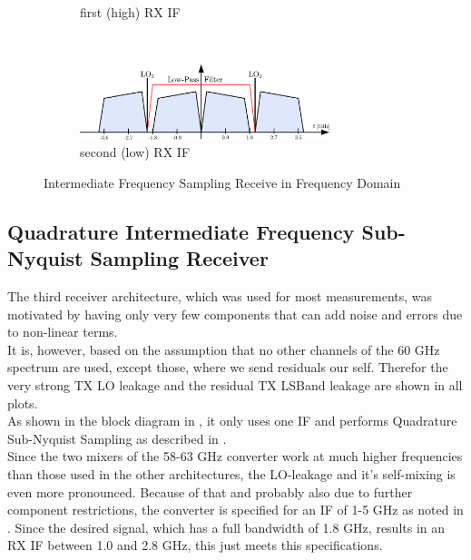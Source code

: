 \begin{figure}[p]
\begin{subfigure}{\textwidth}
    \caption{first (high) \gls{RX} \gls{IF}}
    \label{fig:rx_1_freq_rx_if1}
  \end{subfigure}
  \vspace{4ex} \\
  \begin{subfigure}{\textwidth}
    \centering
    \includegraphics[width=0.8\textwidth]{figures/rx_1_freq_rx_if2}
    \caption{second (low) \gls{RX} \gls{IF}}
    \label{fig:rx_1_freq_rx_if2}
  \end{subfigure}
  \caption{Intermediate Frequency Sampling Receive in Frequency Domain}
  \label{fig:rx_1_freq}
\end{figure}

\subsection{Quadrature Intermediate Frequency Sub-Nyquist Sampling Receiver}
\label{sec:rx_2}
The third receiver architecture, which was used for most measurements,
was motivated by having only very few components that can add noise
and errors due to non-linear terms. \\

It is, however, based on the assumption that no other channels of the
60 GHz spectrum are used, except those, where we send residuals our self.
Therefor the very strong \gls{TX} \gls{LO} leakage and
the residual \gls{TX} \gls{LSBand} leakage are shown in all plots. \\

As shown in the block diagram in , it only uses one
\gls{IF} and performs Quadrature Sub-Nyquist Sampling as described
in . \\

Since the two mixers of the 58-63 GHz converter work at much
higher frequencies than those used in the other architectures, the
\gls{LO}-leakage and it's self-mixing is even more pronounced.
Because of that and probably also due to further component restrictions,
the converter is specified for an \gls{IF} of 1-5 GHz as noted in
.
Since the desired signal, which has a full bandwidth of 1.8 GHz,
results in an \gls{RX} \gls{IF} between 1.0 and 2.8 GHz, this just meets
this specifications. \\

